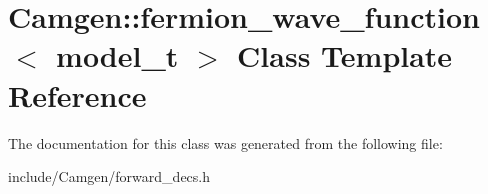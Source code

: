 \hypertarget{a00220}{\section{Camgen\-:\-:fermion\-\_\-wave\-\_\-function$<$ model\-\_\-t $>$ Class Template Reference}
\label{a00220}
}


The documentation for this class was generated from the following file\-:\begin{DoxyCompactItemize}
\item 
include/\-Camgen/forward\-\_\-decs.\-h\end{DoxyCompactItemize}
